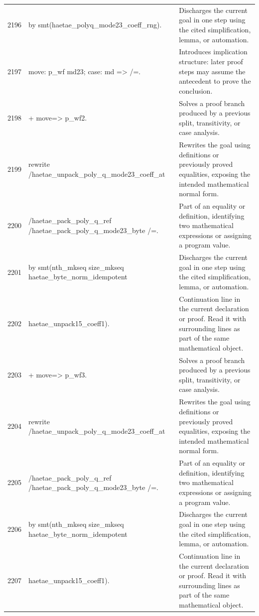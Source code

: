 \documentclass[10pt]{article}
\begin{document}
\begin{longtable}{r L{0.53\textwidth} L{0.37\textwidth}}
2196 & {\ttfamily\scriptsize   by smt(haetae\_polyq\_mode23\_coeff\_rng).} & Discharges the current goal in one step using the cited simplification, lemma, or automation. \\
2197 & {\ttfamily\scriptsize move: p\_wf md23; case: md => /=.} & Introduces implication structure: later proof steps may assume the antecedent to prove the conclusion. \\
2198 & {\ttfamily\scriptsize + move=> p\_wf2.} & Solves a proof branch produced by a previous split, transitivity, or case analysis. \\
2199 & {\ttfamily\scriptsize   rewrite /haetae\_unpack\_poly\_q\_mode23\_coeff\_at} & Rewrites the goal using definitions or previously proved equalities, exposing the intended mathematical normal form. \\
2200 & {\ttfamily\scriptsize           /haetae\_pack\_poly\_q\_ref /haetae\_pack\_poly\_q\_mode23\_byte /=.} & Part of an equality or definition, identifying two mathematical expressions or assigning a program value. \\
2201 & {\ttfamily\scriptsize   by smt(nth\_mkseq size\_mkseq haetae\_byte\_norm\_idempotent} & Discharges the current goal in one step using the cited simplification, lemma, or automation. \\
2202 & {\ttfamily\scriptsize          haetae\_unpack15\_coeff1).} & Continuation line in the current declaration or proof.  Read it with surrounding lines as part of the same mathematical object. \\
2203 & {\ttfamily\scriptsize + move=> p\_wf3.} & Solves a proof branch produced by a previous split, transitivity, or case analysis. \\
2204 & {\ttfamily\scriptsize   rewrite /haetae\_unpack\_poly\_q\_mode23\_coeff\_at} & Rewrites the goal using definitions or previously proved equalities, exposing the intended mathematical normal form. \\
2205 & {\ttfamily\scriptsize           /haetae\_pack\_poly\_q\_ref /haetae\_pack\_poly\_q\_mode23\_byte /=.} & Part of an equality or definition, identifying two mathematical expressions or assigning a program value. \\
2206 & {\ttfamily\scriptsize   by smt(nth\_mkseq size\_mkseq haetae\_byte\_norm\_idempotent} & Discharges the current goal in one step using the cited simplification, lemma, or automation. \\
2207 & {\ttfamily\scriptsize          haetae\_unpack15\_coeff1).} & Continuation line in the current declaration or proof.  Read it with surrounding lines as part of the same mathematical object. \\

\end{longtable}
\end{document}
